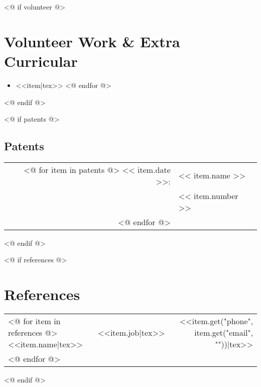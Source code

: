 \documentclass[letter,11pt]{article}
\begin{document}

<@ if volunteer @>
\section*{Volunteer Work \& Extra Curricular}

\begin{samepage}
\begin{itemize}[leftmargin=1.5em]
    \setlength{\itemsep}{0pt}
    \setlength{\parskip}{0pt}
    \setlength{\parsep}{0pt}
<@ for item in volunteer @>
    \item <<item|tex>>
<@ endfor @>
\end{itemize}
\end{samepage}
<@ endif @>


<@ if patents @>
\begin{samepage}
\section*{Patents}

\begin{tabular}{rl}
<@ for item in  patents @>
    << item.date >>: & << item.name >> \\
                & << item.number >> \\
<@ endfor @>
\end{tabular}
\end{samepage}
<@ endif @>


<@ if references @>
\newpage

\section*{References}
\begin{tabularx}{0.75\textwidth}{lCr}
<@ for item in references @>
    <<item.name|tex>> & <<item.job|tex>> & <<item.get("phone", item.get("email", ""))|tex>>\\
<@ endfor @>
\end{tabularx}

<@ endif @>

\end{document}

